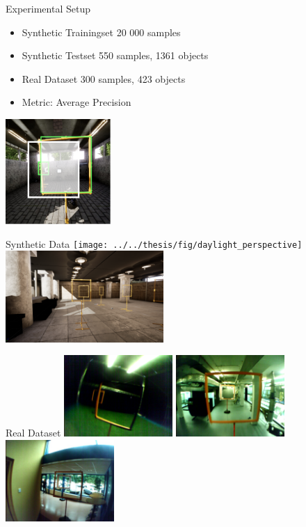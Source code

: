 \documentclass{beamer}
\begin{document}
\begin{darkframes}
\begin{frame}{Experimental Setup}
\centering
\begin{itemize}
	\item Synthetic Trainingset 20 000 samples
	\item Synthetic Testset 550 samples, 1361 objects
	\item Real Dataset 300 samples, 423 objects
	\item Metric: Average Precision
\end{itemize}
\includegraphics[width=0.3\textwidth]{fig/iou_example}

\end{frame}

\begin{frame}{Synthetic Data}
\centering
\texttt{[image: ../../thesis/fig/daylight\_perspective]}
\includegraphics[width=0.45\textwidth]{../../thesis/fig/iros_perspective}
\end{frame}

\begin{frame}{Real Dataset}
\centering
\includegraphics[width=0.31\textwidth]{../../thesis/fig/real_cyberzoo1.png}
\includegraphics[width=0.31\textwidth]{../../thesis/fig/basement}
\includegraphics[width=0.31\textwidth]{../../thesis/fig/hallway}
\end{frame}


\end{darkframes}
\end{document}
